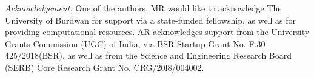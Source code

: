 \documentclass[%
reprint,
superscriptaddress,
amsmath,amssymb,
aps,
prb,
showkeys,
]{revtex4-2}
\begin{document}
	
	{\it Acknowledgement:}
	One of the authors, MR would like to acknowledge The University of Burdwan for support via a state-funded fellowship, as well as for providing computational resources. AR acknowledges support from the University Grants Commission (UGC) of India, via BSR Startup Grant No. F.30-425/2018(BSR), as well as from the Science and Engineering Research Board (SERB) Core Research Grant No. CRG/20l8/004002.
	
	\nocite{*}
	
	
\end{document}

